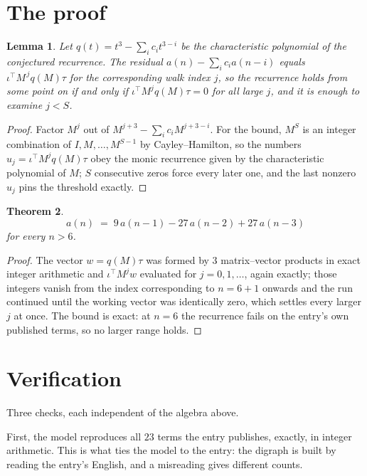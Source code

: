 \documentclass[11pt,a4paper]{article}
\theoremstyle{plain}
\newtheorem{theorem}{Theorem}
\newtheorem{lemma}[theorem]{Lemma}
\theoremstyle{definition}
\begin{document}
\section{The proof}

\begin{lemma}\label{lem:crit}
Let $q(t)=t^{3}-\sum_i c_it^{3-i}$ be the characteristic polynomial of the
conjectured recurrence. The residual $a(n)-\sum_ic_ia(n-i)$ equals
$\iota^{\!\top}M^{\,j}q(M)\tau$ for the corresponding walk index $j$, so the recurrence
holds from some point on if and only if $\iota^{\!\top}M^{j}q(M)\tau=0$ for all large $j$,
and it is enough to examine $j<S$.
\end{lemma}

\begin{proof}
Factor $M^{j}$ out of $M^{j+3}-\sum_ic_iM^{j+3-i}$. For the bound, $M^{S}$
is an integer combination of $I,M,\dots,M^{S-1}$ by Cayley--Hamilton, so the numbers
$u_j=\iota^{\!\top}M^{j}q(M)\tau$ obey the monic recurrence given by the characteristic
polynomial of $M$; $S$ consecutive zeros force every later one, and the last nonzero $u_j$
pins the threshold exactly.
\end{proof}

\begin{theorem}
\[
a(n)\;=\;9\,a(n-1) - 27\,a(n-2) + 27\,a(n-3)
\]
for every $n>6$.
\end{theorem}

\begin{proof}
The vector $w=q(M)\tau$ was formed by $3$ matrix--vector products in exact integer
arithmetic and $\iota^{\!\top}M^{j}w$ evaluated for $j=0,1,\dots$, again exactly; those
integers vanish from the index corresponding to $n=6+1$ onwards and the run continued
until the working vector was identically zero, which settles every larger $j$ at once. The bound is exact: at $n=6$ the recurrence fails on the entry's own published terms, so no larger range holds.
\end{proof}

\section{Verification}

Three checks, each independent of the algebra above.

First, the model reproduces all $23$ terms the entry publishes, exactly, in integer
arithmetic. This is what ties the model to the entry: the digraph is built by reading the
entry's English, and a misreading gives different counts.
\end{document}
